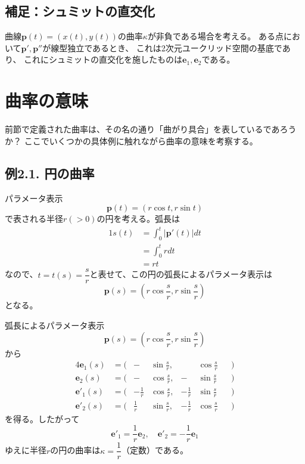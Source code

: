 \documentclass[a4j,disablejfam,dvipdfmx,papersize,slide,uplatex,21pt]{jsarticle}
\begin{document}
\newpage
\subsection*{補足：シュミットの直交化}
曲線$\bm{p}(t) = (x(t), y(t))$の曲率$\kappa$が非負である場合を考える。
ある点において$\bm{p}', \bm{p}''$が線型独立であるとき、
これは2次元ユークリッド空間の基底であり、
これにシュミットの直交化を施したものは$\bm{e}_1, \bm{e}_2$である。




\section{曲率の意味}
前節で定義された曲率は、その名の通り「曲がり具合」を表しているであろうか？
ここでいくつかの具体例に触れながら曲率の意味を考察する。

\newpage
\subsection*{例2.1. 円の曲率}
パラメータ表示
\begin{equation}
    \bm{p}(t) = (r \cos t, r \sin t)
\end{equation}
で表される半径$r (> 0)$の円を考える。弧長は
\begin{alignat}{1}
    s(t) &= \int_0^t |\bm{p}'(t)| dt \\
        &= \int_0^t r dt \\
        &= rt
\end{alignat}
なので、$t = t(s) = \dfrac{s}{r}$と表せて、この円の弧長によるパラメータ表示は
\begin{equation}
    \bm{p}(s) = \left(r \cos \frac{s}{r}, r \sin \frac{s}{r}\right)
\end{equation}
となる。

\newpage
弧長によるパラメータ表示
\begin{equation}
    \bm{p}(s) = \left(r \cos \frac{s}{r}, r \sin \frac{s}{r}\right)
\end{equation}
から
\begin{alignat}{4}
    \bm{e}_1(s) &=  \bigl(&- &\sin \frac{s}{r},& &\cos \frac{s}{r} &&\bigr) \\
    \bm{e}_2(s) &=  \bigl(&- &\cos \frac{s}{r},& -&\sin \frac{s}{r} &&\bigr) \\
    \bm{e}'_1(s) &= \bigl(&- \frac{1}{r} &\cos \frac{s}{r},& - \frac{1}{r} &\sin \frac{s}{r} &&\bigr) \\
    \bm{e}'_2(s) &= \bigl(&\frac{1}{r} &\sin \frac{s}{r},& - \frac{1}{r} &\cos \frac{s}{r} &&\bigr)
\end{alignat}
を得る。したがって
\begin{equation}
    \bm{e}'_1 = \frac{1}{r} \bm{e}_2,\quad
    \bm{e}'_2 = -\frac{1}{r} \bm{e}_1
\end{equation}
ゆえに半径$r$の円の曲率は$\kappa = \dfrac{1}{r}$（定数）である。
\end{document}
